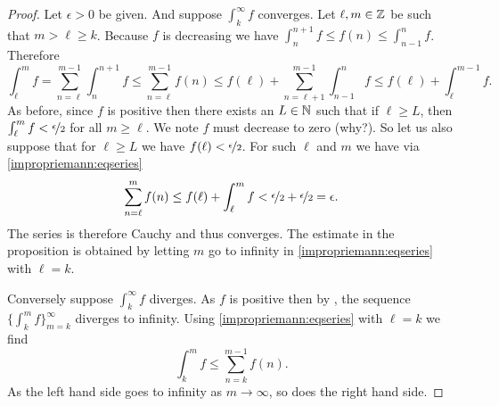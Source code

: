 \begin{proof}
Let $\epsilon > 0$ be given.  And suppose $\int_k^\infty f$ converges.
Let $\ell, m \in {\mathbb{Z}}$ be such that $m > \ell \geq k$.
Because $f$ is decreasing we have
$\int_{n}^{n+1} f \leq f(n) \leq \int_{n-1}^{n} f$.  Therefore
\begin{equation} \label{impropriemann:eqseries}
\int_\ell^m f
=
\sum_{n=\ell}^{m-1} \int_{n}^{n+1} f
\leq
\sum_{n=\ell}^{m-1} f(n)
\leq
f(\ell) +
\sum_{n=\ell+1}^{m-1} \int_{n-1}^{n} f
\leq
f(\ell)+
\int_\ell^{m-1} f .
\end{equation}
As before, since $f$ is positive then there exists
an $L \in {\mathbb{N}}$ such that if $\ell \geq L$, then
$\int_\ell^{m} f < \nicefrac{\epsilon}{2}$ for all $m \geq \ell$.
We note 
$f$ must decrease to zero (why?).  So let us also suppose
that for $\ell \geq L$ we have $f(\ell) < \nicefrac{\epsilon}{2}$.
For such $\ell$ and $m$ we have via \eqref{impropriemann:eqseries}
\begin{equation*}
\sum_{n=\ell}^{m} f(n)
\leq
f(\ell)+
\int_\ell^{m} f < \nicefrac{\epsilon}{2} + \nicefrac{\epsilon}{2} = \epsilon .
\end{equation*}
The series is therefore Cauchy and thus converges.  The estimate in the
proposition is obtained by letting $m$ go to infinity in
\eqref{impropriemann:eqseries} with $\ell = k$.

Conversely suppose $\int_k^\infty f$ diverges.  
As $f$ is positive then by
,
the sequence $\{ \int_k^m f \}_{m=k}^\infty$ diverges to infinity.
Using
\eqref{impropriemann:eqseries} with $\ell = k$ we find
\begin{equation*}
\int_k^m f
\leq
\sum_{n=k}^{m-1} f(n) .
\end{equation*}
As the left hand side goes to infinity as $m \to \infty$, so does the right
hand side.
\end{proof}

